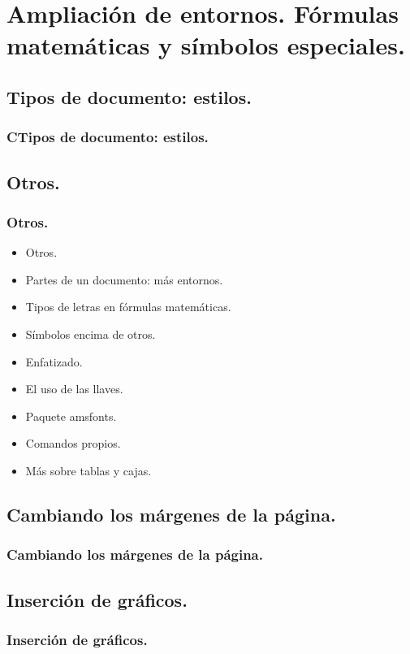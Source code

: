\documentclass{beamer}
\begin{document}
\section{Ampliación de entornos. Fórmulas matemáticas y símbolos especiales.}

\subsection{Tipos de documento: estilos.}
\begin{frame}
  \frametitle{CTipos de documento: estilos.}
\end{frame}

\subsection{Otros.}
\begin{frame}
  \frametitle{Otros.}
  \begin{itemize}
  \item<1->{Otros.}
  \item<2->{Partes de un documento: más entornos.}
  \item<3->{Tipos de letras en fórmulas matemáticas.}
  \item<4->{Símbolos encima de otros.}
  \item<5->{Enfatizado.}
  \item<6->{El uso de las llaves.}
  \item<7->{Paquete amsfonts.}
  \item<8->{Comandos propios.}
  \item<9->{Más sobre tablas y cajas.}
  \end{itemize}
\end{frame}

\subsection{Cambiando los márgenes de la página.}
\begin{frame}
  \frametitle{Cambiando los márgenes de la página.}
\end{frame}

\subsection{Inserción de gráficos.}
\begin{frame}
  \frametitle{Inserción de gráficos.}
\end{frame}
\end{document}
